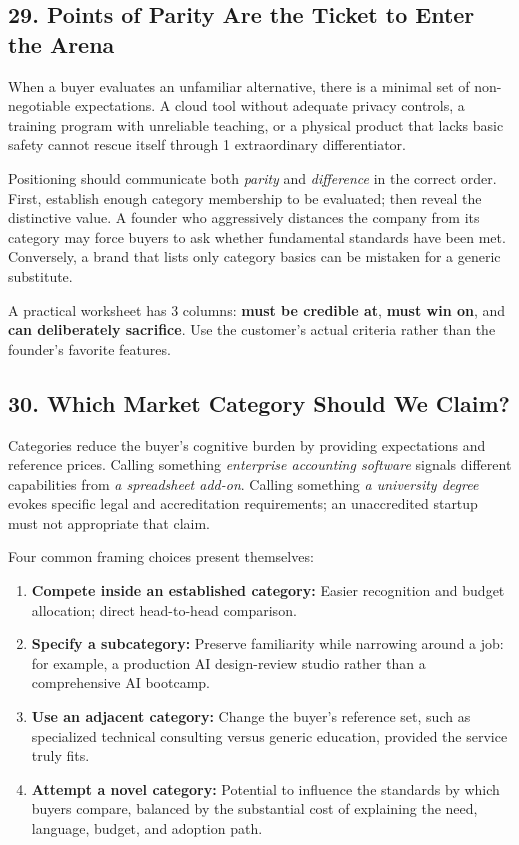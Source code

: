 \subsection*{29. Points of Parity Are the Ticket to Enter the Arena}

When a buyer evaluates an unfamiliar alternative, there is a minimal set of non-negotiable expectations. A cloud tool without adequate privacy controls, a training program with unreliable teaching, or a physical product that lacks basic safety cannot rescue itself through 1 extraordinary differentiator.

Positioning should communicate both \emph{parity} and \emph{difference} in the correct order. First, establish enough category membership to be evaluated; then reveal the distinctive value. A founder who aggressively distances the company from its category may force buyers to ask whether fundamental standards have been met. Conversely, a brand that lists only category basics can be mistaken for a generic substitute.

A practical worksheet has 3 columns: \textbf{must be credible at}, \textbf{must win on}, and \textbf{can deliberately sacrifice}. Use the customer's actual criteria rather than the founder's favorite features.

\subsection*{30. Which Market Category Should We Claim?}

Categories reduce the buyer's cognitive burden by providing expectations and reference prices. Calling something \emph{enterprise accounting software} signals different capabilities from \emph{a spreadsheet add-on}. Calling something \emph{a university degree} evokes specific legal and accreditation requirements; an unaccredited startup must not appropriate that claim.

Four common framing choices present themselves:

\begin{enumerate}
    \item \textbf{Compete inside an established category:} Easier recognition and budget allocation; direct head-to-head comparison.
    \item \textbf{Specify a subcategory:} Preserve familiarity while narrowing around a job: for example, a production AI design-review studio rather than a comprehensive AI bootcamp.
    \item \textbf{Use an adjacent category:} Change the buyer's reference set, such as specialized technical consulting versus generic education, provided the service truly fits.
    \item \textbf{Attempt a novel category:} Potential to influence the standards by which buyers compare, balanced by the substantial cost of explaining the need, language, budget, and adoption path.
\end{enumerate}

